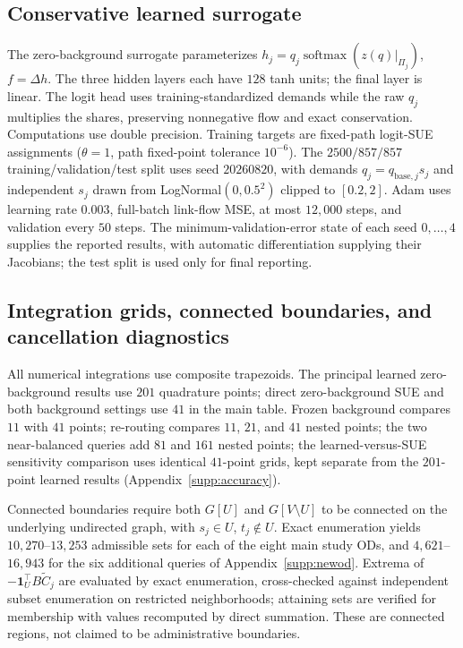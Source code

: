 \subsection{Conservative learned surrogate}\label{supp:protocol}
The zero-background surrogate parameterizes
$h_j=q_j\operatorname{softmax}(z(q)|_{\Pi_j})$, $f=\Delta h$.
The three hidden layers each have $128$ tanh units; the final layer is
linear. The logit head uses training-standardized demands while the raw
$q_j$ multiplies the shares, preserving nonnegative flow and exact
conservation. Computations use double precision.
Training targets are fixed-path logit-SUE assignments ($\theta=1$,
path fixed-point tolerance $10^{-6}$). The $2500/857/857$
training/validation/test split uses seed $20260820$, with demands
$q_j=q_{\mathrm{base},j}s_j$ and independent $s_j$ drawn from
LogNormal$(0,0.5^2)$ clipped to $[0.2,2]$.
Adam uses learning rate $0.003$, full-batch link-flow MSE, at most
$12{,}000$ steps, and validation every $50$ steps. The
minimum-validation-error state of each seed $0,\ldots,4$ supplies
the reported results, with automatic differentiation supplying their
Jacobians; the test split is used only for final reporting.

\subsection{Integration grids, connected boundaries, and cancellation diagnostics}\label{supp:quadrature}
All numerical integrations use composite trapezoids. The principal
learned zero-background results use $201$ quadrature points; direct
zero-background SUE and both background settings use $41$ in the main
table. Frozen background compares $11$ with $41$ points; re-routing
compares $11$, $21$, and $41$ nested points; the two near-balanced
queries add $81$ and $161$ nested points; the learned-versus-SUE
sensitivity comparison uses identical $41$-point grids, kept separate
from the $201$-point learned results (Appendix~\ref{supp:accuracy}).

Connected boundaries require both $G[U]$ and $G[V\setminus U]$ to be
connected on the underlying undirected graph, with $s_j\in U$, $t_j\notin U$.
Exact enumeration yields $10{,}270$--$13{,}253$ admissible sets for each
of the eight main study ODs, and $4{,}621$--$16{,}943$ for the six
additional queries of Appendix~\ref{supp:newod}.
Extrema of $-\mathbf1_U^\top B\widetilde C_j$ are evaluated by exact
enumeration, cross-checked against independent subset enumeration on
restricted neighborhoods; attaining sets are verified for membership
with values recomputed by direct summation. These are connected
regions, not claimed to be administrative boundaries.

